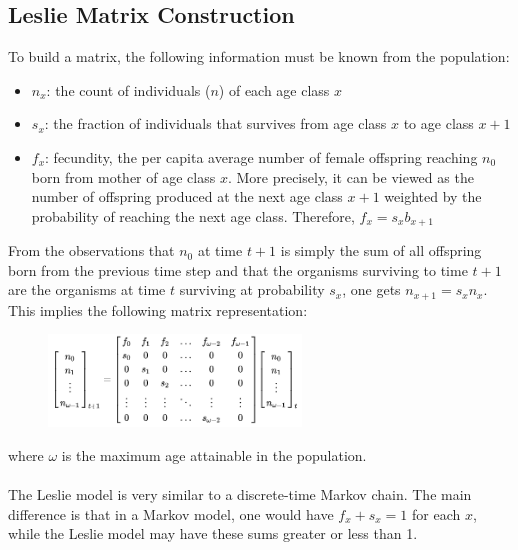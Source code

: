 \documentclass[12pt]{article}
\begin{document}
\subsection{Leslie Matrix Construction}
To build a matrix, the following information must be known from the population:
\begin{itemize}
\item $n_{x}$: the count of individuals ($n$) of each age class $x$
\item $s_{x}$: the fraction of individuals that survives from age class $x$ to age class $x+1$
\item $f_{x}$: fecundity, the per capita average number of female offspring reaching $n_{0}$ born from mother of age class $x$. More precisely, it can be viewed as the number of offspring produced at the next age class $x+1$ weighted by the probability of reaching the next age class. Therefore, $f_x = s_xb_{x+1}$
\end{itemize}
From the observations that $n_{0}$ at time $t+1$ is simply the sum of all offspring born from the previous time step and that the organisms surviving to time $t+1$ are the organisms at time $t$ surviving at probability $s_{x}$, one gets $n_{x+1} = s_xn_x$. This implies the following matrix representation:
\begin{figure}[H]
  \centering
  \includegraphics[width=0.6\textwidth]{leslie model.png}
\end{figure}
where $\omega$ is the maximum age attainable in the population.\\\\
The Leslie model is very similar to a discrete-time Markov chain. The main difference is that in a Markov model, one would have $f_x + s_x = 1$ for each $x$, while the Leslie model may have these sums greater or less than 1.
\end{document}
